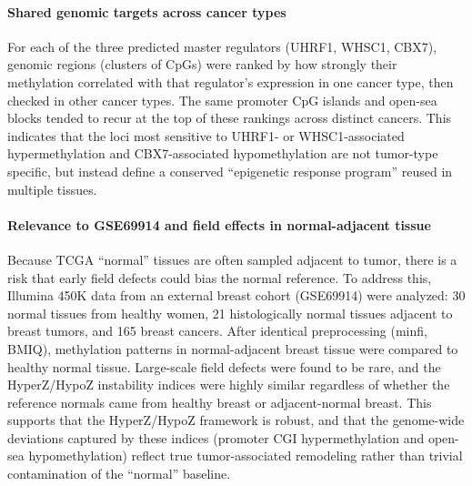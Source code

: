 \documentclass[10pt]{extarticle}
\begin{document}
\paragraph{Shared genomic targets across cancer types}
For each of the three predicted master regulators (UHRF1, WHSC1, CBX7), genomic regions (clusters of CpGs) were ranked by how strongly their methylation correlated with that regulator’s expression in one cancer type, then checked in other cancer types. The same promoter CpG islands and open-sea blocks tended to recur at the top of these rankings across distinct cancers. This indicates that the loci most sensitive to UHRF1- or WHSC1-associated hypermethylation and CBX7-associated hypomethylation are not tumor-type specific, but instead define a conserved “epigenetic response program” reused in multiple tissues.

\paragraph{Relevance to GSE69914 and field effects in normal-adjacent tissue}
Because TCGA “normal” tissues are often sampled adjacent to tumor, there is a risk that early field defects could bias the normal reference. To address this, Illumina 450K data from an external breast cohort (GSE69914) were analyzed: 30 normal tissues from healthy women, 21 histologically normal tissues adjacent to breast tumors, and 165 breast cancers. After identical preprocessing (minfi, BMIQ), methylation patterns in normal-adjacent breast tissue were compared to healthy normal tissue. Large-scale field defects were found to be rare, and the HyperZ/HypoZ instability indices were highly similar regardless of whether the reference normals came from healthy breast or adjacent-normal breast. This supports that the HyperZ/HypoZ framework is robust, and that the genome-wide deviations captured by these indices (promoter CGI hypermethylation and open-sea hypomethylation) reflect true tumor-associated remodeling rather than trivial contamination of the “normal” baseline.
\end{document}
